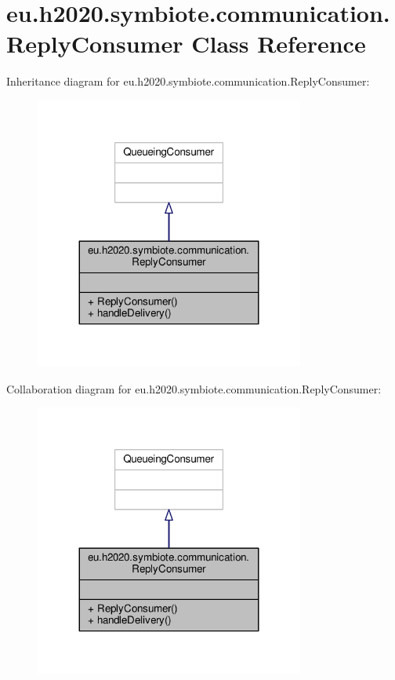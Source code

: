 \hypertarget{classeu_1_1h2020_1_1symbiote_1_1communication_1_1ReplyConsumer}{}\section{eu.\+h2020.\+symbiote.\+communication.\+Reply\+Consumer Class Reference}
\label{classeu_1_1h2020_1_1symbiote_1_1communication_1_1ReplyConsumer}


Inheritance diagram for eu.\+h2020.\+symbiote.\+communication.\+Reply\+Consumer\+:
\nopagebreak
\begin{figure}[H]
\begin{center}
\leavevmode
\includegraphics[width=251pt]{classeu_1_1h2020_1_1symbiote_1_1communication_1_1ReplyConsumer__inherit__graph}
\end{center}
\end{figure}


Collaboration diagram for eu.\+h2020.\+symbiote.\+communication.\+Reply\+Consumer\+:
\nopagebreak
\begin{figure}[H]
\begin{center}
\leavevmode
\includegraphics[width=251pt]{classeu_1_1h2020_1_1symbiote_1_1communication_1_1ReplyConsumer__coll__graph}
\end{center}
\end{figure}
